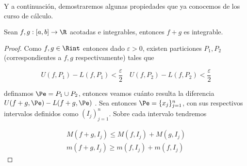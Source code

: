 \noindent Y a continuación, demostraremos algunas propiedades que ya conocemos de los curso de cálculo.

\begin{teo}\label{teo:intamasb}
    Sean $f, g: [a,b] \rightarrow \R$ acotadas e integrables, entonces $f + g$ es integrable.\footnotemark
\end{teo}

\begin{proof}
    Como $f,g \in \Rint$ entonces dado $\varepsilon > 0$, existen particiones $P_1, P_2$ (correspondientes a $f, g$ respectivamente) tales que
    
    \[
    U(f,P_1) - L(f,P_1) < \frac{\varepsilon}{2} \quad U(f,P_2) - L(f,P_2) < \frac{\varepsilon}{2}
    \]
    
    \noindent definamos $\Pe = P_1 \cup P_2$, entonces veamos cuánto resulta la diferencia $U(f+g, \Pe) - L(f+g, \Pe)$ . Sea entonces $\Pe = \{x_j\}_{j=1}^n$, con sus respectivos intervalos definidos como $(I_j)_{j=1}^n$. Sobre cada intervalo tendremos 
    
    \begin{gather}\label{eq:amasb}
        M(f+g, I_j) \leq M(f, I_j) + M(g, I_j) \\
        m(f+g, I_j) \geq m(f, I_j) + m(f, I_j) \nonumber
    \end{gather}
    
\end{proof}
